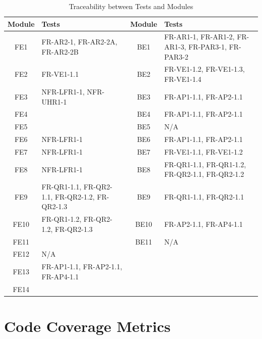 \documentclass[12pt, titlepage]{article}
\begin{document}
    \begin{table}[H]
        \centering
        \begin{tabularx}{\textwidth}{|c|X|c|X|}
            \hline
            \textbf{Module} & \textbf{Tests} & \textbf{Module} & \textbf{Tests} \\ \hline
            FE1 & FR-AR2-1, FR-AR2-2A, FR-AR2-2B & BE1 & FR-AR1-1, FR-AR1-2, FR-AR1-3, FR-PAR3-1, FR-PAR3-2 \\ \hline
            FE2 & FR-VE1-1.1 & BE2 & FR-VE1-1.2, FR-VE1-1.3, FR-VE1-1.4 \\ \hline
            FE3 & NFR-LFR1-1, NFR-UHR1-1 & BE3 & FR-AP1-1.1, FR-AP2-1.1 \\ \hline
            FE4 & & BE4 & FR-AP1-1.1, FR-AP2-1.1 \\ \hline
            FE5 & & BE5 & N/A \\ \hline
            FE6 & NFR-LFR1-1 & BE6 & FR-AP1-1.1, FR-AP2-1.1 \\ \hline
            FE7 & NFR-LFR1-1 & BE7 & FR-VE1-1.1, FR-VE1-1.2 \\ \hline
            FE8 & NFR-LFR1-1 & BE8 & FR-QR1-1.1, FR-QR1-1.2, FR-QR2-1.1, FR-QR2-1.2 \\ \hline
            FE9 & FR-QR1-1.1, FR-QR2-1.1, FR-QR2-1.2, FR-QR2-1.3 & BE9 & FR-QR1-1.1, FR-QR2-1.1\\ \hline
            FE10 & FR-QR1-1.2, FR-QR2-1.2, FR-QR2-1.3 & BE10 & FR-AP2-1.1, FR-AP4-1.1 \\ \hline
            FE11 & & BE11 & N/A \\ \hline
            FE12 & N/A & & \\ \hline
            FE13 & FR-AP1-1.1, FR-AP2-1.1, FR-AP4-1.1 & & \\ \hline
            FE14 & & & \\ \hline
        \end{tabularx}
        \caption{Traceability between Tests and Modules}
        \label{tab:modtrace}
    \end{table}

\section{Code Coverage Metrics}
\end{document}
